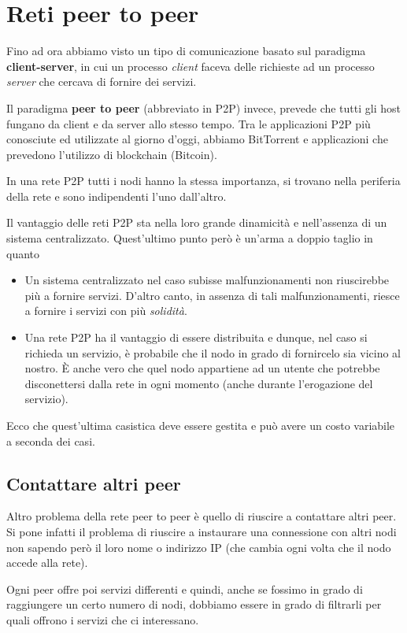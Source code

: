\chapter{Reti peer to peer}
Fino ad ora abbiamo visto un tipo di comunicazione basato sul paradigma
\textbf{client-server}, in cui un processo \emph{client} faceva delle
richieste ad un processo \emph{server} che cercava di fornire dei
servizi.

Il paradigma \textbf{peer to peer} (abbreviato in P2P) invece, prevede 
che tutti gli host fungano da client e da server allo stesso tempo.
Tra le applicazioni P2P più conosciute ed utilizzate al giorno d'oggi,
abbiamo BitTorrent e applicazioni che prevedono l'utilizzo di 
blockchain (Bitcoin).

In una rete P2P tutti i nodi hanno la stessa importanza, si trovano
nella periferia della rete e sono indipendenti l'uno dall'altro.

Il vantaggio delle reti P2P sta nella loro grande dinamicità e 
nell'assenza di un sistema centralizzato. Quest'ultimo punto però è
un'arma a doppio taglio in quanto
\begin{itemize}
	\item Un sistema centralizzato nel caso subisse malfunzionamenti
		non riuscirebbe più a fornire servizi. D'altro canto, in 
		assenza di tali malfunzionamenti, riesce a fornire i servizi
		con più \emph{solidità}.
	\item Una rete P2P ha il vantaggio di essere distribuita e dunque,
		nel caso si richieda un servizio, è probabile che il nodo in
		grado di fornircelo sia vicino al nostro. \`E anche vero che
		quel nodo appartiene ad un utente che potrebbe disconettersi
		dalla rete in ogni momento (anche durante l'erogazione del
		servizio).
\end{itemize}
Ecco che quest'ultima casistica deve essere gestita e può avere un 
costo variabile a seconda dei casi.

\section{Contattare altri peer}
Altro problema della rete peer to peer è quello di riuscire a 
contattare altri peer. Si pone infatti il problema di riuscire a
instaurare una connessione con altri nodi non sapendo però il loro
nome o indirizzo IP (che cambia ogni volta che il nodo accede alla 
rete).

Ogni peer offre poi servizi differenti e quindi, anche se fossimo in
grado di raggiungere un certo numero di nodi, dobbiamo essere in grado
di filtrarli per quali offrono i servizi che ci interessano.

